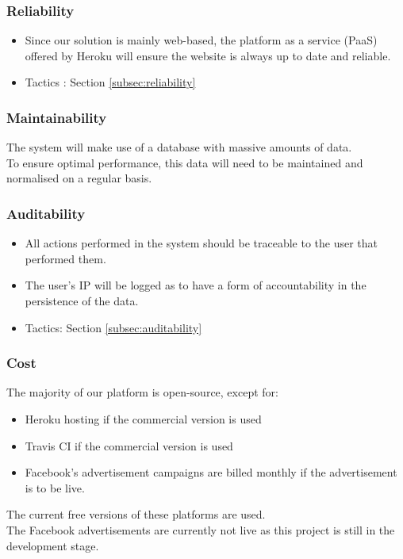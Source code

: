 \documentclass{article}
\begin{document}
		\subsubsection{Reliability}
		\begin{itemize}
			\item Since our solution is mainly web-based, the platform as a service (PaaS) offered by Heroku will ensure the website is always up to date and reliable.
			\item Tactics : Section \ref{subsec:reliability}
		\end{itemize}

		\subsubsection{Maintainability}
			The system will make use of a database with massive amounts of data.\\ To ensure optimal performance, this data will need to be maintained and normalised on a regular basis.

		\subsubsection{Auditability}
		\begin{itemize}
			\item All actions performed in the system should be traceable to the user that performed them.
			\item The user's IP  will be logged as to have a form of accountability in the persistence of the data.
			\item Tactics: Section \ref{subsec:auditability}
		\end{itemize}

		\subsubsection{Cost}
		The majority of our platform is open-source, except for:
		\begin{itemize}
			\item Heroku hosting if the commercial version is used
			\item Travis CI if the commercial version is used
			\item Facebook's advertisement campaigns are billed monthly if the advertisement is to be live.
		\end{itemize}
		The current free versions of these platforms are used. \\
		The Facebook advertisements are currently not live as this project is still in the development stage.
\end{document}
